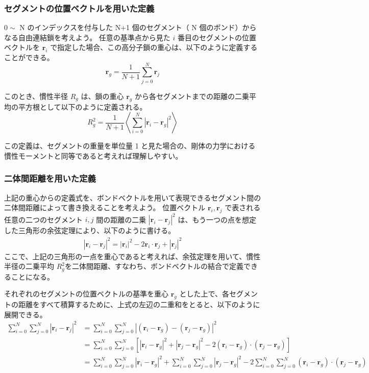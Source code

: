 \documentclass[11pt]{jsarticle}
\begin{document}
\begin{appendix}
\subsubsection{セグメントの位置ベクトルを用いた定義}

$0\sim$ N のインデックスを付与した N+1 個のセグメント（ N 個のボンド）からなる自由連結鎖を考えよう。
任意の基準点から見た $i$ 番目のセグメントの位置ベクトルを $\bm{r}_i$ で指定した場合、この高分子鎖の重心は、以下のように定義することができる。
\begin{equation*}
\bm{r}_g = \dfrac{1}{N+1} \sum_{j=0}^{N} \bm{r}_j
\end{equation*}

このとき、慣性半径 $R_g$ は、鎖の重心 $\bm{r}_g$ から各セグメントまでの距離の二乗平均の平方根として以下のように定義される。
\begin{equation*}
R_g^2 = \dfrac{1}{N+1} \left\langle \sum_{i=0}^{N} |\bm{r}_i - \bm{r}_g|^2 \right\rangle
\end{equation*}

この定義は、セグメントの重量を単位量 1 と見た場合の、剛体の力学における慣性モーメントと同等であると考えれば理解しやすい。

\subsubsection{二体間距離を用いた定義}

上記の重心からの定義式を、ボンドベクトルを用いて表現できるセグメント間の二体間距離によって書き換えることを考えよう。
位置ベクトル $\bm{r}_{i}, \bm{r}_{j}$ で表される任意の二つのセグメント $i, j$ 間の距離の二乗 $|\bm{r}_{i} - \bm{r}_{j}|^2$ は、もう一つの点を想定した三角形の余弦定理により、以下のように書ける。 
\begin{align*}
|\bm{r}_{i} - \bm{r}_{j}|^2 = |\bm{r}_{i}|^2 - 2 \bm{r}_{i}\cdot\bm{r}_{j} + |\bm{r}_{j}|^2
\end{align*}
ここで、上記の三角形の一点を重心であると考えれば、余弦定理を用いて、慣性半径の二乗平均 $R_g^2$を二体間距離、すなわち、ボンドベクトルの結合で定義できることになる。

それぞれのセグメントの位置ベクトルの基準を重心 $\bm{r}_g$ とした上で、各セグメントの距離をすべて積算するために、上式の左辺の二重和をとると、以下のように展開できる。
\begin{align*}
\sum_{i = 0}^N \sum_{j=0}^N \left| \bm{r}_i - \bm{r}_j \right|^2
	&= \sum_{i = 0}^N \sum_{j=0}^N  \left| (\bm{r}_i - \bm{r}_g) - (\bm{r}_j - \bm{r}_g) \right|^2 \\
	&= \sum_{i = 0}^N \sum_{j=0}^N \left[ \left| \bm{r}_i - \bm{r}_g \right|^2 + \left|\bm{r}_j - \bm{r}_g \right|^2 
		-2 (\bm{r}_i - \bm{r}_g) \cdot (\bm{r}_j - \bm{r}_g) \right] \\
	&= \sum_{i = 0}^N \sum_{j=0}^N \left| \bm{r}_i - \bm{r}_g \right|^2 + \sum_{i = 0}^N \sum_{j=0}^N \left|\bm{r}_j - \bm{r}_g \right|^2 
		-2 \sum_{i = 0}^N \sum_{j=0}^N (\bm{r}_i - \bm{r}_g) \cdot (\bm{r}_j - \bm{r}_g)
\end{align*}


\end{appendix}
\end{document}
